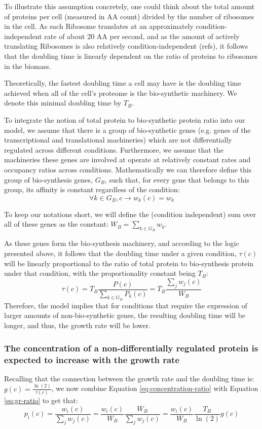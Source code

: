 \documentclass[notitlepage]{article}
\begin{document}
To illustrate this assumption concretely, one could think about the total amount of proteins per cell (measured in AA count) divided by the number of ribosomes in the cell.
As each Ribosome translates at an approximately condition-independent rate of about 20 AA per second, and as the amount of actively translating Ribosomes is also relatively condition-independent (refs), it follows that the doubling time is linearly dependent on the ratio of proteins to ribosomes in the biomass.

Theoretically, the fastest doubling time a cell may have is the doubling time achieved when all of the cell's proteome is the bio-synthetic machinery.
We denote this minimal doubling time by $T_B$.

To integrate the notion of total protein to bio-synthetic protein ratio into our model, we assume that there is a group of bio-synthetic genes (e.g. genes of the transcriptional and translational machineries) which are not differentially regulated across different conditions.
Furthermore, we assume that the machineries these genes are involved at operate at relatively constant rates and occupancy ratios across conditions.
Mathematically we can therefore define this group of bio-synthesis genes, $G_B$, such that, for every gene that belongs to this group, its affinity is constant regardless of the condition:
\begin{equation}
  \label{eq:biosynth-def}
  \forall k \in G_B, c \rightarrow w_k(c)=w_k
\end{equation}

To keep our notations short, we will define the (condition independent) sum over all of these genes as the constant: $W_B = \sum_{k\in G_B}w_k$.

As these genes form the bio-synthesis machinery, and according to the logic presented above, it follows that the doubling time under a given condition, $\tau(c)$ will be linearly proportional to the ratio of total protein to bio-synthesis protein under that condition, with the proportionality constant being $T_B$:
\begin{equation}
  \label{eq:gr-ratio}
  \tau(c) = T_B\frac{P(c)}{\sum_{k\in G_B}P_k(c)}=T_B\frac{\sum_jw_j(c)}{W_B}
\end{equation}
Therefore, the model implies that for conditions that require the expression of larger amounts of non-bio-synthetic genes, the resulting doubling time will be longer, and thus, the growth rate will be lower.

\subsubsection{The concentration of a non-differentially regulated protein is expected to increase with the growth rate} 
Recalling that the connection between the growth rate and the doubling time is: $g(c)=\frac{\ln(2)}{\tau(c)}$, we now combine Equation \ref{eq:concentration-ratio} with Equation \ref{eq:gr-ratio} to get that:
\begin{equation}
  \label{eq:default-response}
  p_i(c)=\frac{w_i(c)}{\sum_jw_j(c)}=\frac{w_i(c)}{W_B}\frac{W_B}{\sum_jw_j(c)}=\frac{w_i(c)}{W_B}\frac{T_B}{\ln(2)}g(c)
\end{equation}
\end{document}
